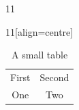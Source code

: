 \documentclass[paper=A4]{ropas-poster}
\begin{document}
\begin{postergrid}{1}{1}
  \begin{posterblock}{1}{1}[align=centre]
    \ifdim\tabcolsep=6bp\else
      \PackageError{ropas-test}{Incorrect block tabular spacing}{}
    \fi
    \begin{table}[t]
      \caption{A small table}
      \begin{tabular}{cc}
        First & Second \\
        One & Two
      \end{tabular}
    \end{table}
  \end{posterblock}
\end{postergrid}
\end{document}
